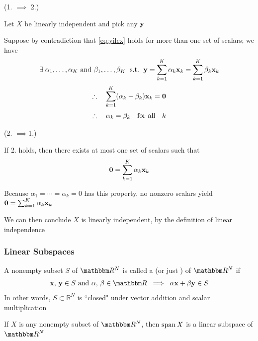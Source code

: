 \begin{frame}

    \vspace{2em}
    \Prf 
    (1. $\implies$ 2.)
    
    Let $X$ be linearly independent and pick any ${\mathbf y}$  
    
    Suppose by contradiction that \eqref{eq:yilcx} holds for more than one set of scalars; we have
    \begin{equation*}
        \exists \;
        \alpha_1, \ldots, \alpha_K
        \text{ and } \beta_1, \ldots, \beta_K
        \; \ \mathrm{s.t.}\  \; 
        {\mathbf y} 
        = \sum_{k=1}^K \alpha_k {\mathbf x}_k
        = \sum_{k=1}^K \beta_k {\mathbf x}_k
    \end{equation*}
    \begin{equation*}
        \therefore \quad \sum_{k=1}^K (\alpha_k - \beta_k) {\mathbf x}_k = {\mathbf 0}
    \end{equation*} 
    \begin{equation*}
        \therefore \quad
        \alpha_k = \beta_k 
        \quad \text{for all} \quad k
    \end{equation*}
 
\end{frame}

\begin{frame}
    
    \Prf (2. $\implies$1.)
    
    If 2. holds, then there exists at most one set of scalars such that \[{\mathbf 0} =
    \sum_{k=1}^K \alpha_k {\mathbf x}_k\]
    
    Because $\alpha_1 = \cdots = \alpha_k = 0$
    has this property, no nonzero scalars yield ${\mathbf 0} =
    \sum_{k=1}^K \alpha_k {\mathbf x}_k$
    
    We can then conclude $X$ is linearly
    independent, by the definition of linear independence 
    

\end{frame}


\begin{frame}\frametitle{Linear Subspaces}

    \vspace{2em}
    A  nonempty subset $S$ of $\RR^N$ is called a  (or just
    ) of $\RR^N$
    if
    \begin{equation*}
        \label{eq:lsubd}
        \boldx, \, \boldy \in S
        \text{ and } \alpha, \, \beta \in \RR
        \; \implies \; 
        \alpha \boldx + \beta \boldy \in S
    \end{equation*}
    In other words, $S\subset \mathbb{R}^{N}$ is ``closed" under vector addition
     and scalar multiplication 
    
    \vspace{2em}
    \Eg 
    If $X$ is any
    nonempty subset of $\RR^N$, then $\operatorname{span} X$ is a linear subspace of
    $\RR^N$

\end{frame}

